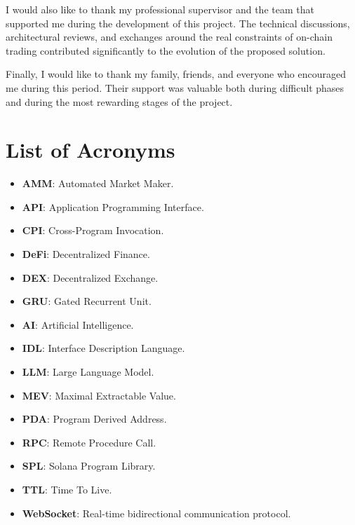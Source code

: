 \documentclass[12pt,a4paper]{report}
\begin{document}
I would also like to thank my professional supervisor and the team that supported me during the development of this project. The technical discussions, architectural reviews, and exchanges around the real constraints of on-chain trading contributed significantly to the evolution of the proposed solution.

Finally, I would like to thank my family, friends, and everyone who encouraged me during this period. Their support was valuable both during difficult phases and during the most rewarding stages of the project.

\newpage

\tableofcontents
\listoftables
\listoffigures
\newpage

\chapter*{List of Acronyms}

\begin{itemize}
    \item \textbf{AMM}: Automated Market Maker.
    \item \textbf{API}: Application Programming Interface.
    \item \textbf{CPI}: Cross-Program Invocation.
    \item \textbf{DeFi}: Decentralized Finance.
    \item \textbf{DEX}: Decentralized Exchange.
    \item \textbf{GRU}: Gated Recurrent Unit.
    \item \textbf{AI}: Artificial Intelligence.
    \item \textbf{IDL}: Interface Description Language.
    \item \textbf{LLM}: Large Language Model.
    \item \textbf{MEV}: Maximal Extractable Value.
    \item \textbf{PDA}: Program Derived Address.
    \item \textbf{RPC}: Remote Procedure Call.
    \item \textbf{SPL}: Solana Program Library.
    \item \textbf{TTL}: Time To Live.
    \item \textbf{WebSocket}: Real-time bidirectional communication protocol.
\end{itemize}
\end{document}
